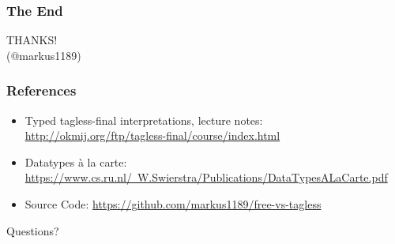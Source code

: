 \documentclass[aspectratio=169, hyperref={colorlinks, linkcolor=beamer@centricgreen}, urlcolor=links]{beamer}
\begin{document}
\begin{frame}
  \frametitle{The End}
  \begin{center}
    {
      \Huge
      THANKS!\\
    }
    \vfill
    (@markus1189)
  \end{center}
\end{frame}

\begin{frame}
  \frametitle{References}
  \begin{center}
    \begin{itemize}
    \item Typed tagless-final interpretations, lecture notes: \href{http://okmij.org/ftp/tagless-final/course/index.html}{http://okmij.org/ftp/tagless-final/course/index.html}
    \item Datatypes \`{a} la carte: \href{https://www.cs.ru.nl/~W.Swierstra/Publications/DataTypesALaCarte.pdf}{https://www.cs.ru.nl/~W.Swierstra/Publications/DataTypesALaCarte.pdf}
    \item Source Code: \href{https://github.com/markus1189/free-vs-tagless}{https://github.com/markus1189/free-vs-tagless}
    \end{itemize}
    \vfill
    {
      \Huge{}Questions?
    }
  \end{center}
\end{frame}

\appendix{}
\end{document}

